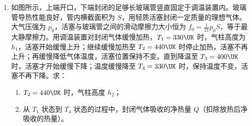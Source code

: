 \documentclass[\gkver]{gaokaozhenti}
\begin{document}
\begin{enumerate}
\item
如图所示，上端开口，下端封闭的足够长玻璃管竖直固定于调温装置内。玻璃管导热性能良好，管内横截面积为 $S$，用轻质活塞封闭一定质量的理想气体。大气压强为 $p_{0}$，活塞与玻璃管之间的滑动摩擦力大小恒为 $f_{0} = \frac{1}{21}p_{0}S$，等于最大静摩擦力。用调温装置对封闭气体缓慢加热，$T_{1} = 330 \UK$ 时，气柱高度为 $h_{1}$，活塞开始缓慢上升；继续缓慢加热至 $T_{2} = 440 \UK$ 时停止加热，活塞不再上升；再缓慢降低气体温度，活塞位置保持不变，直到降温至 $T_{3} = 400 \UK$ 时，活塞才开始缓慢下降；温度缓慢降至 $T_{4} = 330 \UK$ 时，保持温度不变，活塞不再下降。求：
\begin{enumerate}
	\item
	$T_{2} = 440 \UK$ 时，气柱高度 $h_{2}$；
	\item
	从 $T_{1}$ 状态到 $T_{4}$ 状态的过程中，封闭气体吸收的净热量 $Q$（扣除放热后净吸收的热量）。
\end{enumerate}


\end{enumerate}
\end{document}
